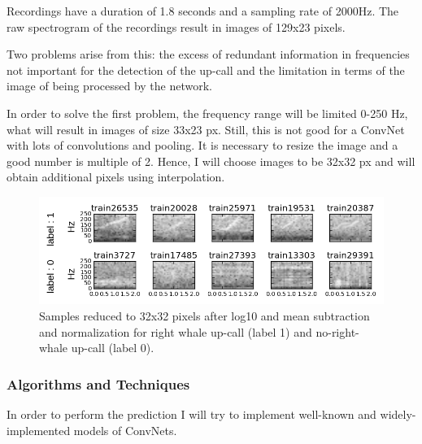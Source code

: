 \documentclass[]{article}
\begin{document}
Recordings have a duration of 1.8 seconds and a sampling rate of 2000Hz. The raw spectrogram of the recordings result in images of 129x23 pixels.

Two problems arise from this: the excess of redundant information in frequencies not important for the detection of the up-call and the limitation in terms of the image of being processed by the network.

In order to solve the first problem, the frequency range will be limited 0-250 Hz, what will result in images of size 33x23 px. Still, this is not good for a ConvNet with lots of convolutions and pooling. It is necessary to resize the image and a good number is multiple of 2. Hence, I will choose images to be 32x32 px and will obtain additional pixels using interpolation.

\begin{figure}[htpb!]
\centering
\includegraphics[width= \textwidth]{./images/2_samples_cropped}
\caption{Samples reduced to 32x32 pixels after log10 and mean subtraction and normalization for right whale up-call (label 1) and no-right-whale up-call (label 0).  \label{img:samples_processed}}
\end{figure} 

\subsubsection{Algorithms and
Techniques}\label{algorithms-and-techniques}

In order to perform the prediction I will try to implement well-known and widely-implemented models of ConvNets.
\end{document}
